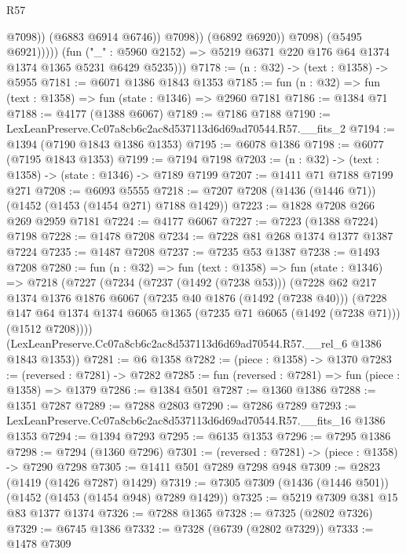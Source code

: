 \begin{lexlean}{R57}
\begin{coremodule}
                              @7098))
                          (@6883 @6914 @6746))
                        @7098))
                    (@6892 @6920))
                  @7098)
                (@5495 @6921)))))
        (fun ("_" : @5960 @2152) => @5219 @6371 @220 @176 @64 @1374 @1374 @1365 @5231 @6429 @5235)))
@7178 := (n : @32) -> (text : @1358) -> @5955
@7181 := @6071 @1386 @1843 @1353
@7185 := fun (n : @32) => fun (text : @1358) => fun (state : @1346) => @2960 @7181
@7186 := @1384 @71
@7188 := @4177 (@1388 @6067)
@7189 := @7186 @7188
@7190 := LexLeanPreserve.Cc07a8cb6c2ac8d537113d6d69ad70544.R57.__fits_2
@7194 := @1394 (@7190 @1843 @1386 @1353)
@7195 := @6078 @1386
@7198 := @6077 (@7195 @1843 @1353)
@7199 := @7194 @7198
@7203 := (n : @32) -> (text : @1358) -> (state : @1346) -> @7189 @7199
@7207 := @1411 @71 @7188 @7199 @271
@7208 := @6093 @5555
@7218 := @7207 @7208 (@1436 (@1446 @71)) (@1452 (@1453 (@1454 @271) @7188 @1429))
@7223 := @1828 @7208 @266 @269 @2959 @7181
@7224 := @4177 @6067
@7227 := @7223 (@1388 @7224) @7198
@7228 := @1478 @7208
@7234 := @7228 @81 @268 @1374 @1377 @1387 @7224
@7235 := @1487 @7208
@7237 := @7235 @53 @1387
@7238 := @1493 @7208
@7280 := fun (n : @32) =>
  fun (text : @1358) =>
  fun (state : @1346) =>
  @7218
    (@7227
      (@7234
        (@7237 (@1492 (@7238 @53)))
        (@7228
          @62
          @217
          @1374
          @1376
          @1876
          @6067
          (@7235 @40 @1876 (@1492 (@7238 @40)))
          (@7228
            @147
            @64
            @1374
            @1374
            @6065
            @1365
            (@7235 @71 @6065 (@1492 (@7238 @71)))
            (@1512 @7208))))
      (LexLeanPreserve.Cc07a8cb6c2ac8d537113d6d69ad70544.R57.__rel_6 @1386 @1843 @1353))
@7281 := @6 @1358
@7282 := (piece : @1358) -> @1370
@7283 := (reversed : @7281) -> @7282
@7285 := fun (reversed : @7281) => fun (piece : @1358) => @1379
@7286 := @1384 @501
@7287 := @1360 @1386
@7288 := @1351 @7287
@7289 := @7288 @2803
@7290 := @7286 @7289
@7293 := LexLeanPreserve.Cc07a8cb6c2ac8d537113d6d69ad70544.R57.__fits_16 @1386 @1353
@7294 := @1394 @7293
@7295 := @6135 @1353
@7296 := @7295 @1386
@7298 := @7294 (@1360 @7296)
@7301 := (reversed : @7281) -> (piece : @1358) -> @7290 @7298
@7305 := @1411 @501 @7289 @7298 @948
@7309 := @2823 (@1419 (@1426 @7287) @1429)
@7319 := @7305 @7309 (@1436 (@1446 @501)) (@1452 (@1453 (@1454 @948) @7289 @1429))
@7325 := @5219 @7309 @381 @15 @83 @1377 @1374
@7326 := @7288 @1365
@7328 := @7325 (@2802 @7326)
@7329 := @6745 @1386
@7332 := @7328 (@6739 (@2802 @7329))
@7333 := @1478 @7309

\end{coremodule}
\end{lexlean}
